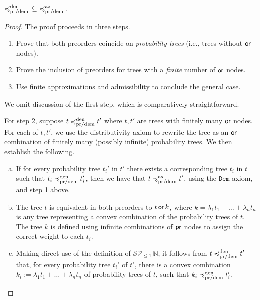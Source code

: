 \begin{lemma}
\label{lemma:completeness}
${\preccurlyeq^{\text{den}}_{\text{pr/dem}}} \, \subseteq \, \, \preccurlyeq^{\text{ax}}_{\text{pr/dem}}\,$.
\end{lemma}
\begin{proof}
The proof proceeds in three steps.
    \begin{enumerate}
        \item Prove that both preorders coincide 
            on \emph{probability trees} (i.e., trees without $\operatorname{\textsf{or}}$ nodes).
        \item Prove the inclusion of preorders for
             trees with a \emph{finite} number 
            of $\operatorname{\textsf{or}}$ nodes.
        \item Use finite approximations and admissibility
            to conclude the general case.
    \end{enumerate}

We omit discussion of the first step, which  is comparatively straightforward.

For step 2, suppose $t \preccurlyeq^{\text{den}}_{\text{pr/dem}} t'$ where $t,t'$ are 
trees with finitely many $\operatorname{\textsf{or}}$ nodes. For each of $t, t'$, we use the distributivity axiom to rewrite the tree
          as an $\operatorname{\textsf{or}}$-combination of finitely many (possibly infinite) {probability trees}. We then establish the following.
    \begin{enumerate}[(a)]
         \item 
            If for every 
            probability
            tree $t_i'$ in $t'$ there exists 
            a corresponding tree $t_i$ in $t$ 
            such that $t_i \preccurlyeq^{\text{den}}_{\text{pr/dem}} t_i'$,
            then we have that $t \preccurlyeq^{\text{ax}}_{\text{pr/dem}} t'$, using the $\texttt{Dem}$ axiom, and  step 1 above.

        \item 
            The tree $t$ is equivalent  in both preorders  to 
            $t \operatorname{\textsf{or}} k$, where $k = \lambda_1t_1+ \dots + \lambda_n t_n$
            is any tree representing a convex combination of the probability trees of $t$.
            The tree $k$ is defined  using infinite combinations of $\operatorname{\textsf{pr}}$ nodes to assign the correct weight to each $t_i$.
    
        \item Making direct use of the definition of $\mathcal{S}\mathcal{V}_{\leq 1}\, \mathbb{N}$, it follows from $t \preccurlyeq^{\text{den}}_{\text{pr/dem}} t'$ that, for every
            probability tree   $t_i'$ of $t'$,
            there is a convex combination
            $k_i := \lambda_1t_1+ \dots + \lambda_n t_n$
            of probability trees of $t$,
                        such that $k_i \preccurlyeq^{\text{den}}_{\text{pr/dem}} t_i'$.



\end{enumerate}
\end{proof}
